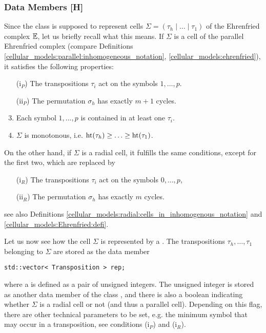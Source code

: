 \subsubsection{Data Members [H]}
\label{program:kappa:tuple:members}
Since the class  is supposed to represent cells $\Sigma = (\tau_h \mid \ldots \mid \tau_1)$ of the Ehrenfried complex $\mathbb E$, 
let us briefly recall what this means. 
If $\Sigma$ is a cell of the parallel Ehrenfried complex 
(compare Definitions \ref{cellular_models:parallel:inhomogeneous_notation}, \ref{cellular_models:ehrenfried}), 
it satisfies the following properties:
\begin{enumerate}
 \item[(i$_P$)] The transpositions $\tau_i$ act on the symbols $1, \dotsc, p$.
 \item[(ii$_P$)] The permutation $\sigma_h$ has exactly $m+1$ cycles.
 \setcounter{enumi}{2}
 \item Each symbol $1, \dotsc, p$ is contained in at least one $\tau_i$.
 \item $\Sigma$ is monotonous, i.e. $\operatorname{ht}(\tau_h) \geq \dotsc \geq \operatorname{ht}(\tau_1)$.
\end{enumerate}
On the other hand, if $\Sigma$ is a radial cell, it fulfills the same conditions, 
except for the first two, which are replaced by
\begin{enumerate}
 \item[(i$_R$)] The transpositions $\tau_i$ act on the symbols $0, \dotsc, p$,
 \item[(ii$_R$)] The permutation $\sigma_h$ has exactly $m$ cycles.
\end{enumerate}
see also Definitions \ref{cellular_models:radial:cells_in_inhomogenous_notation} and \ref{cellular_models:Ehrenfried:defi}.

Let us now see how the cell $\Sigma$ is represented by a .
The transpositions $\tau_h, \dotsc, \tau_1$ belonging to $\Sigma$ are stored as the data member
\begin{lstlisting}
std::vector< Transposition > rep;
\end{lstlisting}
where a  is defined as a pair of unsigned integers.
The unsigned integer  is stored as another data member of the class ,
and there is also a boolean  indicating whether $\Sigma$ is a radial cell or not (and thus a parallel cell).
Depending on this flag, there are other technical parameters to be set, 
e.g. the minimum symbol that may occur in a transposition, see conditions (i$_P$) and (i$_R$).


